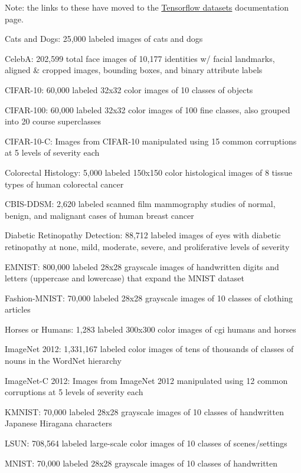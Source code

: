 \documentclass{tufte-handout}
\begin{document}
Note: the links to these have moved to the \href{https://www.tensorflow.org/datasets/catalog/overview#all_datasets}{Tensorflow datasets} documentation page.

\bi
\item
Cats and Dogs: 25,000 labeled images of cats and dogs
\item
CelebA: 202,599 total face images of 10,177 identities w/ facial landmarks,
  aligned \& cropped images, bounding boxes, and binary attribute labels
\item
  CIFAR-10:
  60,000 labeled 32x32 color images of 10 classes of objects
\item
CIFAR-100:
  60,000 labeled 32x32 color images of 100 fine classes, also grouped
  into 20 course superclasses
\item
 CIFAR-10-C:
  Images from CIFAR-10 manipulated using 15 common corruptions at 5
  levels of severity each
\item
Colorectal Histology: 5,000 labeled 150x150 color histological images of 8
  tissue types of human colorectal cancer
\item
CBIS-DDSM:
  2,620 labeled scanned film mammography studies of normal, benign, and
  malignant cases of human breast cancer
\item
 Diabetic
  Retinopathy Detection: 88,712 labeled images of eyes with diabetic
  retinopathy at none, mild, moderate, severe, and proliferative levels
  of severity
\item
EMNIST:
  800,000 labeled 28x28 grayscale images of handwritten digits and
  letters (uppercase and lowercase) that expand the MNIST dataset
\item
  Fashion-MNIST:
  70,000 labeled 28x28 grayscale images of 10 classes of clothing
  articles
\item
 Horses
  or Humans: 1,283 labeled 300x300 color images of cgi humans and
  horses
\item
ImageNet
  2012: 1,331,167 labeled color images of tens of thousands of classes
  of nouns in the WordNet hierarchy
\item
  ImageNet-C
  2012: Images from ImageNet 2012 manipulated using 12 common
  corruptions at 5 levels of severity each
\item
 KMNIST:
  70,000 labeled 28x28 grayscale images of 10 classes of handwritten
  Japanese Hiragana characters
\item
  LSUN:
  708,564 labeled large-scale color images of 10 classes of
  scenes/settings
\item
 MNIST:
  70,000 labeled 28x28 grayscale images of 10 classes of handwritten
\end{document}
